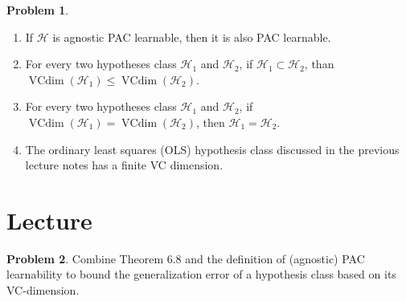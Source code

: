 \documentclass[10pt]{article}
\theoremstyle{definition}
\newtheorem{problem}{Problem}
\DeclareMathOperator{\vcdim}{VCdim}
\begin{document}
\begin{problem}
\begin{enumerate}
        \item
            If $\mathcal H$ is agnostic PAC learnable, then it is also PAC learnable.
            \vspace{2.75in}


        \item
            For every two hypotheses class $\mathcal H_1$ and $\mathcal H_2$,
            if $\mathcal H_1 \subset \mathcal H_2$, than $\vcdim(\mathcal H_1) \le \vcdim(\mathcal H_2)$.
            \vspace{2.75in}

        \item
            For every two hypotheses class $\mathcal H_1$ and $\mathcal H_2$,
            if $\vcdim(\mathcal H_1) = \vcdim(\mathcal H_2)$,
            then $\mathcal H_1 = \mathcal H_2$.
            \vspace{2.75in}

        \item
            The ordinary least squares (OLS) hypothesis class discussed in the previous lecture notes has a finite VC dimension.
            \vspace{2.75in}
    \end{enumerate}
\end{problem}


\newpage
\section{Lecture}


\begin{problem}
    Combine Theorem 6.8 and the definition of (agnostic) PAC learnability to bound the generalization error of a hypothesis class based on its VC-dimension.
\end{problem}
\end{document}
